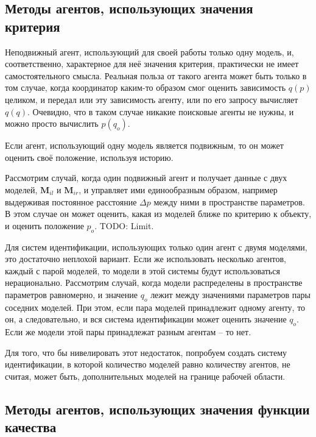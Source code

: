 

\subsection{Методы агентов, использующих значения критерия }  %

Неподвижный агент, использующий для своей работы только одну модель,
и, соответственно, характерное для неё значения критерия,
практически не имеет самостоятельного смысла. Реальная польза от такого агента
может быть только в том случае, когда координатор
каким-то образом смог оценить зависимость $q(p)$ целиком,
и передал или эту зависимость агенту, или по его запросу вычисляет $q(q)$.
Очевидно, что в таком случае никакие поисковые агенты не нужны,
и можно просто вычислить $p(q_o)$.

Если агент, использующий одну модель является подвижным,
то он может оценить своё положение, используя историю.

Рассмотрим случай, когда один подвижный агент и получает данные с двух моделей,
$ \mathbf{M}_{il}$ и
$ \mathbf{M}_{ir}$,
и управляет ими единообразным образом, например
выдерживая постоянное расстояние $\Delta p$ между ними в пространстве параметров.
В этом случае он может оценить, какая из моделей ближе по критерию
к объекту, и оценить положение $p_o$. TODO: Limit.

Для систем идентификации, использующих только один агент с двумя моделями,
это достаточно неплохой вариант.
Если же использовать несколько агентов, каждый с парой моделей,
то модели в этой системы будут использоваться нерационально.
Рассмотрим случай, когда модели распределены в пространстве
параметров равномерно, и значение $q_o$ лежит между значениями
параметров пары соседних моделей.
При этом, если пара моделей принадлежит одному агенту, то он,
а следовательно, и вся система идентификации может
оценить значение $q_o$. Если же модели этой пары
принадлежат разным агентам -- то нет.

Для того, что бы нивелировать этот недостаток,
попробуем создать систему идентификации,
в которой количество моделей равно количеству агентов,
не считая, может быть, дополнительных моделей на границе рабочей области.





\subsection{Методы агентов, использующих значения функции качества }  %

